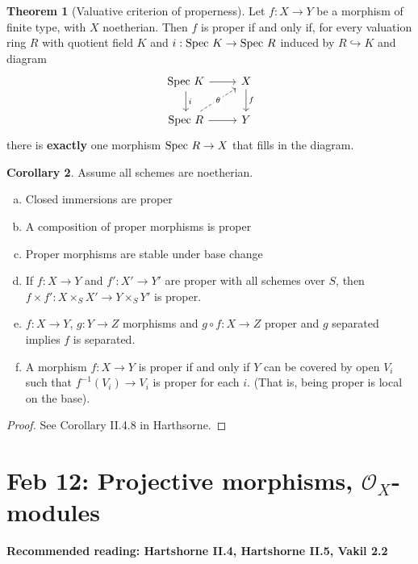 \documentclass[10pt,reqno]{amsart}
\theoremstyle{definition}
\newtheorem{theorem}{Theorem}
\newtheorem{corollary}[theorem]{Corollary}
\theoremstyle{remark}
\numberwithin{equation}{section}
\numberwithin{theorem}{section}
\newcommand{\OO}{{\mathcal O}}
\newcommand{\spec}{\textup{Spec }}
\begin{document}
\begin{theorem}[Valuative criterion of properness] Let $f: X \to Y$ be a morphism of finite type, with $X$ noetherian. Then $f$ is proper if and only if, for every valuation ring $R$ with quotient field $K$ and $i: \spec K \to \spec R$ induced by $R \hookrightarrow K$ and diagram
\[
\begin{tikzcd}
\spec K \arrow[d,"i"] \arrow[r] & X \arrow[d,"f"]\\
\spec R \arrow[r] \arrow[ur,dashed, "\theta" description]& Y
\end{tikzcd}
\]
there is \textbf{exactly} one morphism $\spec R \to X$ that fills in the diagram.
\end{theorem}

 \begin{corollary} Assume all schemes are noetherian.
 \begin{enumerate}[(a)]
 \item Closed immersions are proper
 \item A composition of proper morphisms is proper
 \item Proper morphisms are stable under base change
 \item If $f: X \to Y$ and $f': X' \to Y'$ are proper with all schemes over $S$, then $f \times f': X \times_S X' \to Y \times_S Y'$ is proper.
 \item $f: X \to Y$, $g: Y \to Z$ morphisms and $g \circ f: X \to Z$ proper and $g$ separated implies $f$ is separated.
 \item A morphism $f: X \to Y$ is proper if and only if $Y$ can be covered by open $V_i$ such that $f^{-1}(V_i) \to V_i$ is proper for each $i$. (That is, being proper is local on the base).
 \end{enumerate}
 \end{corollary}
 \begin{proof}
 See Corollary II.4.8 in Harthsorne.
 \end{proof}
\section{Feb 12: Projective morphisms, $\OO_X$-modules}
\textbf{Recommended reading: Hartshorne II.4, Hartshorne II.5, Vakil 2.2} 
\end{document}
